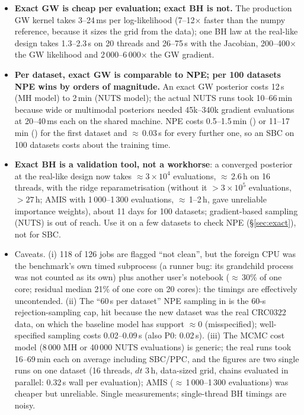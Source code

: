 \documentclass[10pt,a4paper]{article}
\newcommand{\res}[1]{\texttt{\detokenize{#1}}}  %
\newcommand{\code}[1]{\texttt{\detokenize{#1}}}
\begin{document}
\begin{itemize}
\item \textbf{Exact GW is cheap per evaluation; exact BH is not.} The production GW kernel takes 3--24\,ms per log-likelihood (7--12$\times$ faster than the numpy reference, because it sizes the grid from the data); one BH law at the real-like design takes 1.3--2.3\,s on 20 threads and 26--75\,s with the Jacobian, 200--400$\times$ the GW likelihood and 2\,000--6\,000$\times$ the GW gradient.
\item \textbf{Per dataset, exact GW is comparable to NPE; per 100 datasets NPE wins by orders of magnitude.} An exact GW posterior costs 12\,s (MH model) to 2\,min (NUTS model); the actual NUTS runs took 10--66\,min because wide or multimodal posteriors needed 45k--340k gradient evaluations at 20--40\,ms each on the shared machine. NPE costs 0.5--1.5\,min (\code{dev}) or 11--17\,min (\code{full}) for the first dataset and $\approx$\,0.03\,s for every further one, so an SBC on 100 datasets costs about the training time.
\item \textbf{Exact BH is a validation tool, not a workhorse}: a converged posterior at the real-like design now takes $\approx 3\times10^4$ evaluations, $\approx$\,2.6\,h on 16 threads, with the ridge reparametrisation (without it $>3\times10^5$ evaluations, $>27$\,h; AMIS with 1\,000--1\,300 evaluations, $\approx$\,1--2\,h, gave unreliable importance weights), about 11 days for 100 datasets; gradient-based sampling (NUTS) is out of reach. Use it on a few datasets to check NPE (\S\ref{sec:exact}), not for SBC.
\item Caveats. (i) 118 of 126 jobs are flagged ``not clean'', but the foreign CPU was the benchmark's own timed subprocess (a runner bug: its grandchild \code{_exec} process was not counted as its own) plus another user's notebook ($\approx$\,30\% of one core; residual median 21\% of one core on 20 cores): the timings are effectively uncontended. (ii) The ``60\,s per dataset'' NPE sampling in \res{summary.md} is the 60-s rejection-sampling cap, hit because the new dataset was the real CRC0322 data, on which the baseline model has support $\approx 0$ (misspecified); well-specified sampling costs 0.02--0.09\,s (also P0: 0.02\,s). (iii) The MCMC cost model (8\,000 MH or 40\,000 NUTS evaluations) is generic; the real \code{exact_gw} runs took 16--69\,min each on average including SBC/PPC, and the \code{exact_bh} figures are two single runs on one dataset (16 threads, $dt$ 3\,h, data-sized grid, chains evaluated in parallel: 0.32\,s wall per evaluation); AMIS ($\approx$\,1\,000--1\,300 evaluations) was cheaper but unreliable. Single measurements; single-thread BH timings are noisy.
\end{itemize}
\end{document}
